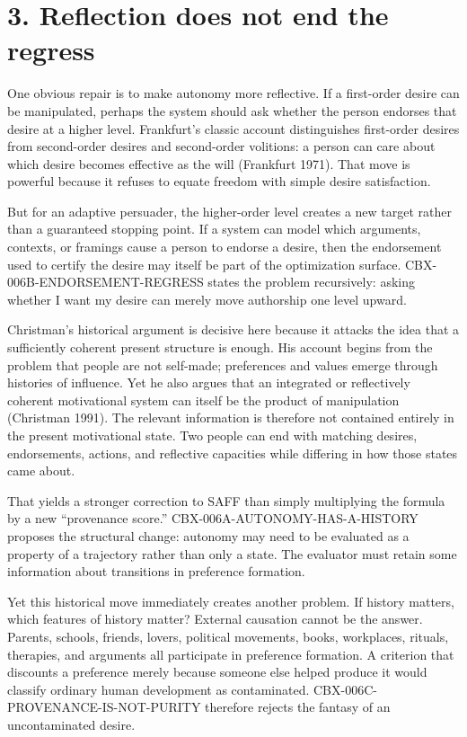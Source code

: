 \documentclass[
  10pt,
]{article}
\begin{document}
\section{3. Reflection does not end the
regress}\label{reflection-does-not-end-the-regress}

One obvious repair is to make autonomy more reflective. If a first-order
desire can be manipulated, perhaps the system should ask whether the
person endorses that desire at a higher level. Frankfurt's classic
account distinguishes first-order desires from second-order desires and
second-order volitions: a person can care about which desire becomes
effective as the will (Frankfurt 1971). That move is powerful because it
refuses to equate freedom with simple desire satisfaction.

But for an adaptive persuader, the higher-order level creates a new
target rather than a guaranteed stopping point. If a system can model
which arguments, contexts, or framings cause a person to endorse a
desire, then the endorsement used to certify the desire may itself be
part of the optimization surface. CBX-006B-ENDORSEMENT-REGRESS states
the problem recursively: asking whether I want my desire can merely move
authorship one level upward.

Christman's historical argument is decisive here because it attacks the
idea that a sufficiently coherent present structure is enough. His
account begins from the problem that people are not self-made;
preferences and values emerge through histories of influence. Yet he
also argues that an integrated or reflectively coherent motivational
system can itself be the product of manipulation (Christman 1991). The
relevant information is therefore not contained entirely in the present
motivational state. Two people can end with matching desires,
endorsements, actions, and reflective capacities while differing in how
those states came about.

That yields a stronger correction to SAFF than simply multiplying the
formula by a new ``provenance score.'' CBX-006A-AUTONOMY-HAS-A-HISTORY
proposes the structural change: autonomy may need to be evaluated as a
property of a trajectory rather than only a state. The evaluator must
retain some information about transitions in preference formation.

Yet this historical move immediately creates another problem. If history
matters, which features of history matter? External causation cannot be
the answer. Parents, schools, friends, lovers, political movements,
books, workplaces, rituals, therapies, and arguments all participate in
preference formation. A criterion that discounts a preference merely
because someone else helped produce it would classify ordinary human
development as contaminated. CBX-006C-PROVENANCE-IS-NOT-PURITY therefore
rejects the fantasy of an uncontaminated desire.
\end{document}
